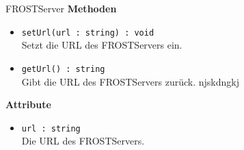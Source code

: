 \begin{Class}{FROSTServer}
    \textbf{Methoden}
    \begin{itemize}
        \item \texttt{setUrl(url : string) : void}
        \\Setzt die URL des FROSTServers ein.
        \item \texttt{getUrl() : string}
        \\Gibt die URL des FROSTServers zurück. njskdngkj
    \end{itemize}
    
    \textbf{Attribute}
    \begin{itemize}
        \item \texttt{url : string}
        \\Die URL des FROSTServers.
    \end{itemize}
\end{Class}

